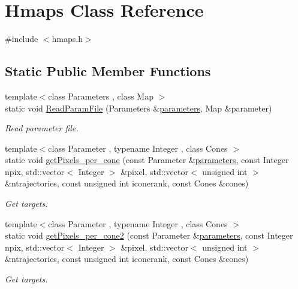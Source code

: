 \hypertarget{classHmaps}{\section{Hmaps Class Reference}
\label{classHmaps}
}


{\ttfamily \#include $<$hmaps.\-h$>$}

\subsection*{Static Public Member Functions}
\begin{DoxyCompactItemize}
\item 
{\footnotesize template$<$class Parameters , class Map $>$ }\\static void \hyperlink{classHmaps_a1742ac13044d46c9132a963475c0745a}{Read\-Param\-File} (Parameters \&\hyperlink{rays_8h_ae1bc8b0b8c8b9f8e4cc61a5cc7c4ce9e}{parameters}, Map \&parameter)
\begin{DoxyCompactList}\small\item\em Read parameter file. \end{DoxyCompactList}\item 
{\footnotesize template$<$class Parameter , typename Integer , class Cones $>$ }\\static void \hyperlink{classHmaps_a6e341b26baa5cc36a1faaa7b1166a9e2}{get\-Pixels\-\_\-per\-\_\-cone} (const Parameter \&\hyperlink{rays_8h_ae1bc8b0b8c8b9f8e4cc61a5cc7c4ce9e}{parameters}, const Integer npix, std\-::vector$<$ Integer $>$ \&pixel, std\-::vector$<$ unsigned int $>$ \&ntrajectories, const unsigned int iconerank, const Cones \&cones)
\begin{DoxyCompactList}\small\item\em Get targets. \end{DoxyCompactList}\item 
{\footnotesize template$<$class Parameter , typename Integer , class Cones $>$ }\\static void \hyperlink{classHmaps_a037a8fd9c68555c04835fa12787121d6}{get\-Pixels\-\_\-per\-\_\-cone2} (const Parameter \&\hyperlink{rays_8h_ae1bc8b0b8c8b9f8e4cc61a5cc7c4ce9e}{parameters}, const Integer npix, std\-::vector$<$ Integer $>$ \&pixel, std\-::vector$<$ unsigned int $>$ \&ntrajectories, const unsigned int iconerank, const Cones \&cones)
\begin{DoxyCompactList}\small\item\em Get targets. \end{DoxyCompactList}\item 

\end{DoxyCompactItemize}
